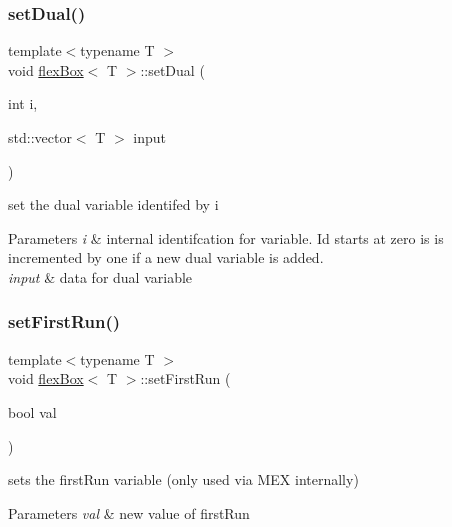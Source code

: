 \subsubsection{\texorpdfstring{set\+Dual()}{setDual()}}
{\footnotesize\ttfamily template$<$typename T $>$ \\
void \hyperlink{classflex_box}{flex\+Box}$<$ T $>$\+::set\+Dual (\begin{DoxyParamCaption}\item[{int}]{i,  }\item[{std\+::vector$<$ T $>$}]{input }\end{DoxyParamCaption})\hspace{0.3cm}{\ttfamily [inline]}}



set the dual variable identifed by i 


\begin{DoxyParams}{Parameters}
{\em i} & internal identifcation for variable. Id starts at zero is is incremented by one if a new dual variable is added. \\
\hline
{\em input} & data for dual variable \\
\hline
\end{DoxyParams}
\mbox{\label{classflex_box_a2d02845bc454275d32d237a4034b15b1}} 
\subsubsection{\texorpdfstring{set\+First\+Run()}{setFirstRun()}}
{\footnotesize\ttfamily template$<$typename T $>$ \\
void \hyperlink{classflex_box}{flex\+Box}$<$ T $>$\+::set\+First\+Run (\begin{DoxyParamCaption}\item[{bool}]{val }\end{DoxyParamCaption})\hspace{0.3cm}{\ttfamily [inline]}}



sets the first\+Run variable (only used via M\+EX internally) 


\begin{DoxyParams}{Parameters}
{\em val} & new value of first\+Run \\
\hline
\end{DoxyParams}
\mbox{\label{classflex_box_aacb08dc862943d6bb24353a62e2c9341}} 
